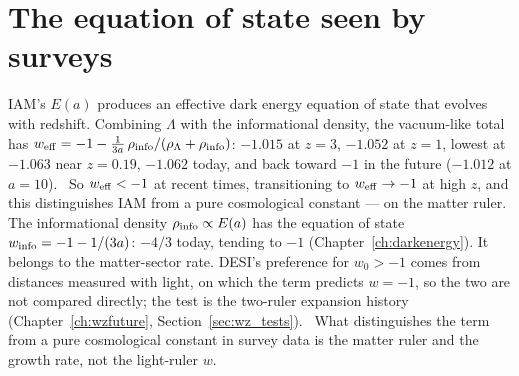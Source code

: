 \section{The equation of state seen by surveys}\label{sec:sp_weff}
IAM's $E(a)$ produces an effective dark energy equation of state that evolves with redshift. Combining $\Lambda$ with the informational density,
the vacuum-like total has $w_{\rm eff}=-1-\tfrac{1}{3a}\,\rho_{\rm info}/(\rho_\Lambda+\rho_{\rm info})$: $-1.015$ at $z=3$, $-1.052$ at $z=1$,
lowest at $-1.063$ near $z=0.19$, $-1.062$ today, and back toward $-1$ in the future ($-1.012$ at $a=10$). \calc\ So $w_{\rm eff}<-1$ at recent times,
transitioning to $w_{\rm eff}\to-1$ at high $z$, and this distinguishes IAM from a pure cosmological constant --- on the matter ruler. The informational density $\rho_{\rm info}\propto E(a)$ has the equation of state $w_{\rm info}=-1-1/(3a)$: $-4/3$ today, tending to $-1$
(Chapter~\ref{ch:darkenergy}). It belongs to the matter-sector rate. DESI's preference for $w_0>-1$ comes from distances measured with light, on
which the term predicts $w=-1$, so the two are not compared directly; the test is the two-ruler expansion history (Chapter~\ref{ch:wzfuture},
Section~\ref{sec:wz_tests}). \derived\ What distinguishes the term from a pure cosmological constant in survey data is the matter ruler and the
growth rate, not the light-ruler $w$.

